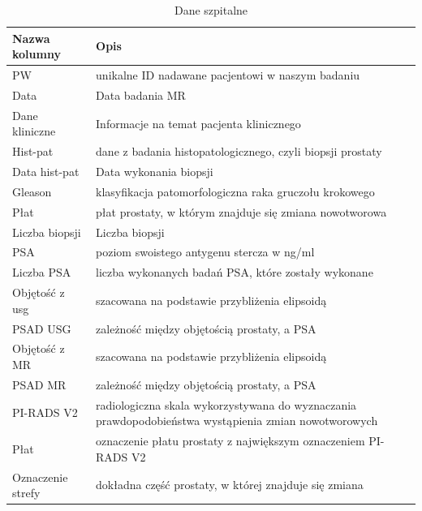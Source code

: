 \documentclass[a4paper,11pt,twoside]{report}
\theoremstyle{definition}
\begin{document}
\begin{table}[!htbp]
\caption{Dane szpitalne}
\centering
\begin{tabular}{|l|p{10cm}|} \hline 
Nazwa kolumny & Opis \\ \hline 
PW & unikalne ID nadawane pacjentowi w naszym badaniu \\ \hline 
Data & Data badania MR \\ \hline 
Dane kliniczne & Informacje na temat pacjenta klinicznego \\ \hline 
Hist-pat & dane z badania histopatologicznego, czyli biopsji prostaty \\ \hline 
Data hist-pat & Data wykonania biopsji                                                                              \\ \hline 
Gleason & klasyfikacja patomorfologiczna raka gruczołu krokowego                                                    \\ \hline 
Płat & płat prostaty, w którym znajduje się zmiana nowotworowa                                                      \\ \hline 
Liczba biopsji & Liczba biopsji                                                   \\\hline 
PSA & poziom swoistego antygenu stercza w ng/ml \\ \hline 
Liczba PSA & liczba wykonanych badań PSA, które zostały wykonane \\ \hline 
Objętość z usg & szacowana na podstawie przybliżenia elipsoidą \\ \hline 
PSAD USG & zależność między objętością prostaty, a PSA                                                              \\ \hline 
Objętość z MR & szacowana na podstawie przybliżenia elipsoidą \\ \hline 
PSAD MR & zależność między objętością prostaty, a PSA                                                               \\ \hline 
PI-RADS V2 & radiologiczna skala wykorzystywana do wyznaczania prawdopodobieństwa wystąpienia zmian nowotworowych   \\ \hline 
Płat & oznaczenie płatu prostaty z największym oznaczeniem PI-RADS V2                                               \\ \hline 
Oznaczenie strefy & dokładna część prostaty, w której znajduje się zmiana                                           \\ \hline 
\end{tabular}
\label{Dane szpitalne}
\end{table}
\end{document}
